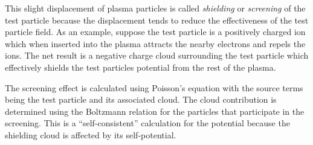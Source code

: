 This slight displacement of plasma particles is called \textit{shielding} or \textit{screening} of the test particle because the displacement tends to reduce the effectiveness of the test particle field. As an example, suppose the test particle is a positively charged ion which when inserted into the plasma attracts the nearby electrons and repels the ions. The net result is a negative charge cloud surrounding the test particle which effectively shields the test particles potential from the rest of the plasma.

The screening effect is calculated using Poisson's equation with the source terms being the test particle and its associated cloud. The cloud contribution is determined using the Boltzmann relation for the particles that participate in the screening. This is a ``self-consistent'' calculation for the potential because the shielding cloud is affected by its self-potential.

